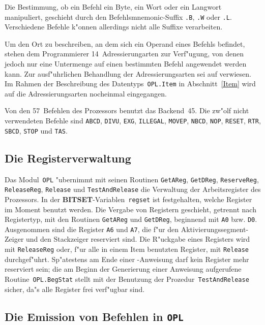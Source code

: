Die Bestimmung, ob ein Befehl ein Byte, ein Wort oder ein Langwort manipuliert,
geschieht durch den Befehlsmnemonic-Suffix {\tt .B}, {\tt .W} oder {\tt .L}.
Verschiedene Befehle k"onnen allerdings nicht alle Suffixe verarbeiten.

Um den Ort zu beschreiben, an dem sich ein Operand eines Befehls befindet,
stehen dem Programmierer 14~Adressierungarten zur Verf"ugung, von denen jedoch
nur eine Untermenge auf einen bestimmten Befehl angewendet werden kann.
Zur ausf"uhrlichen Behandlung der Adressierungsarten sei auf \cite{SC68000} verwiesen.
Im Rahmen der Beschreibung des Datentyps~{\tt OPL.Item} in Abschnitt~\ref{Item}
wird auf die Adressierungsarten nocheinmal eingegangen.

Von den 57~Befehlen des Prozessors benutzt das Backend~45.
Die zw"olf nicht verwendeten Befehle sind {\tt ABCD}, {\tt DIVU}, {\tt EXG},
{\tt ILLEGAL}, {\tt MOVEP}, {\tt NBCD}, {\tt NOP}, {\tt RESET}, {\tt RTR},
{\tt SBCD}, {\tt STOP} und {\tt TAS}.

\subsection{Die Registerverwaltung}

Das Modul~{\tt OPL} "ubernimmt mit seinen Routinen {\tt GetAReg}, {\tt GetDReg},
{\tt ReserveReg}, {\tt ReleaseReg}, {\tt Release} und {\tt TestAndRelease}
die Verwaltung der Arbeitsregister des Prozessors.
In der {\bf BITSET}-Variablen~{\tt regset} ist festgehalten, welche Register
im Moment benutzt werden.
Die Vergabe von Registern geschieht, getrennt nach Registertyp, mit den
Routinen {\tt GetAReg} und {\tt GetDReg}, beginnend mit {\tt A0} bzw. {\tt D0}.
Ausgenommen sind die Register {\tt A6} und {\tt A7}, die f"ur den
Aktivierungssegment-Zeiger und den Stackzeiger reserviert sind.
Die R"uckgabe eines Registers wird mit {\tt ReleaseReg} oder, f"ur alle
in einem Item benutzten Register, mit {\tt Release} durchgef"uhrt.
Sp"atestens am Ende einer \oberon-Anweisung darf kein Register mehr reserviert
sein; die am Beginn der Generierung einer Anweisung aufgerufene Routine~{\tt OPL.BegStat}
stellt mit der Benutzung der Prozedur~{\tt TestAndRelease} sicher, da"s alle
Register frei verf"ugbar sind.

\subsection{Die Emission von Befehlen in {\tt OPL}}

